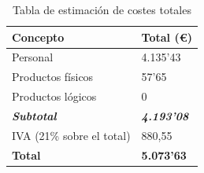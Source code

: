 \begin{center}
	\begin{table}[H]
		\centering
		\begin{tabularx}{10cm}{|X|X|}
			\hline
			\cellcolor{lightblue}\textbf{Concepto} & \cellcolor{lightblue}\textbf{Total (€)}  \\
			\hline
			Personal & 4.135'43 \\
			\hline
			Productos físicos & 57'65 \\
			\hline
			Productos lógicos & 0\\
			\hline
			\textbf{\textit{Subtotal}} & \textbf{\textit{4.193'08}}\\
			\hline
			IVA (21\% sobre el total) & 880,55\\
			\hline
			\textbf{Total} & \textbf{5.073'63} \\
			\hline
		\end{tabularx}
		\caption{Tabla de estimación de costes totales}
	\end{table}
\end{center}


